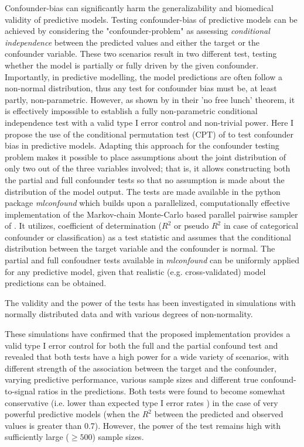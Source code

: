\documentclass{article}
\begin{document}
Confounder-bias can significantly harm the generalizability and biomedical validity of predictive models. Testing confounder-bias of predictive models can be achieved by considering the "confounder-problem" as assessing \emph{conditional independence} between the predicted values and either the target or the confounder variable. These two scenarios result in two different test, testing whether the model is partially or fully driven by the given confounder.
Importantly, in predictive modelling, the model predictions are often follow a non-normal distribution, thus any test for confounder bias must be, at least partly, non-parametric.
However, as shown by \citet{shah2020hardness} in their 'no free lunch' theorem, it is effectively impossible to establish a fully non-parametric conditional independence test with a valid type I error control and non-trivial power.
Here I propose the use of the conditional permutation test (CPT) of \cite{berrett2020conditional} to test confounder bias in predictive models. Adapting this approach for the confounder testing problem makes it possible to place assumptions about the joint distribution of only two out of the three variables involved; that is, it allows constructing both the partial and full confounder tests so that no assumption is made about the distribution of the model output. 
The tests are made available in the python package \emph{mlconfound} which builds upon a parallelized, computationally effective implementation of the Markov-chain Monte-Carlo based parallel pairwise sampler of \cite{berrett2020conditional}. It utilizes, coefficient of determination ($R^2$ or pseudo $R^2$ in case of categorical confounder or classification) as a test statistic and assumes that the conditional distribution between the target variable and the confounder is normal. The partial and full confoudner tests available in \emph{mlconfound} can be uniformly applied for any predictive model, given that realistic (e.g. cross-validated) model predictions can be obtained.

The validity and the power of the tests has been investigated in simulations with normally distributed data and with various degrees of non-normality.

These simulations have confirmed that the proposed implementation provides a valid type I error control for both the full and the partial confound test and revealed that both tests have a high power for a wide variety of scenarios, with different strength of the association between the target and the confounder, varying predictive performance, various sample sizes and different true confound-to-signal ratios in the predictions. 
Both tests were found to become somewhat conservative (i.e. lower than expected type I error rates ) in the case of very powerful predictive models (when the $R^2$ between the predicted and observed values is greater than 0.7). However, the power of the test remains high with sufficiently large ($\ge 500$) sample sizes.
\end{document}
